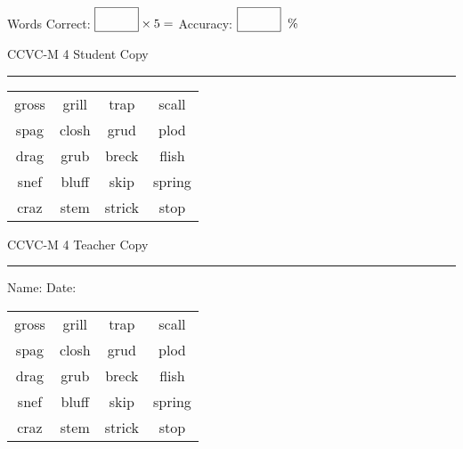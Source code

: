 \documentclass{memoir}
\begin{document}
\small

Words Correct: $\fbox{\phantom{\huge 100}} \times 5 = $ Accuracy: $\fbox{\phantom{\huge 100}}\;\; \%$ 

\vfill

\newpage


\footnotesize \noindent
CCVC-M 4 \hfill Student Copy
\smallskip
\hrule

\Large

\setlength{\tabcolsep}{14pt}
\def\arraystretch{3}

{\selectfont


\begin{vplace}[0.5]
\begin{center}
\begin{tabular}{cccc}
gross                    & grill            & trap & scall \\
spag          & closh            & grud & plod \\
drag        & grub & breck       & flish             \\
snef & bluff & skip & spring \\
craz        & stem & strick & stop \\
\end{tabular}
\end{center}
\end{vplace}

}

\newpage

\footnotesize \noindent
CCVC-M 4 \hfill Teacher Copy
\smallskip
\hrule

\small

\vfill

\noindent
Name: \underline{\hspace{1.75in}} \hfill Date: \underline{\hspace{1in}}

\Large

{\selectfont


\begin{vplace}[0.5]
\begin{center}
\begin{tabular}{cccc}
gross                    & grill            & trap & scall \\
spag          & closh            & grud & plod \\
drag        & grub & breck       & flish             \\
snef & bluff & skip & spring \\
craz        & stem & strick & stop \\
\end{tabular}
\end{center}
\end{vplace}



}
\end{document}
